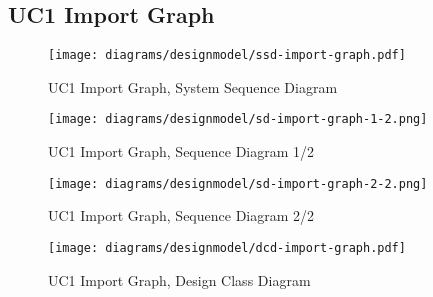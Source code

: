 \subsection{UC1 Import Graph}
\begin{figure}[H]
    \centering
    \texttt{[image: diagrams/designmodel/ssd-import-graph.pdf]}
    \caption{UC1 Import Graph, System Sequence Diagram}
    \label{fig:import-graph-ssd}
\end{figure}
\begin{figure}[p]%
  \begin{leftfullpage}
    \texttt{[image: diagrams/designmodel/sd-import-graph-1-2.png]}
    \caption{UC1 Import Graph, Sequence Diagram 1/2}
    \label{fig:import-graph-sd-1}
  \end{leftfullpage}
\end{figure}
\begin{figure}[p]%
  \begin{fullpage}
    \texttt{[image: diagrams/designmodel/sd-import-graph-2-2.png]}
    \caption{UC1 Import Graph, Sequence Diagram 2/2}
    \label{fig:import-graph-sd-2}
  \end{fullpage}
\end{figure}
\begin{figure}[H]
    \centering
    \texttt{[image: diagrams/designmodel/dcd-import-graph.pdf]}
    \caption{UC1 Import Graph, Design Class Diagram}
    \label{fig:import-graph-dcd}
\end{figure}
% 
